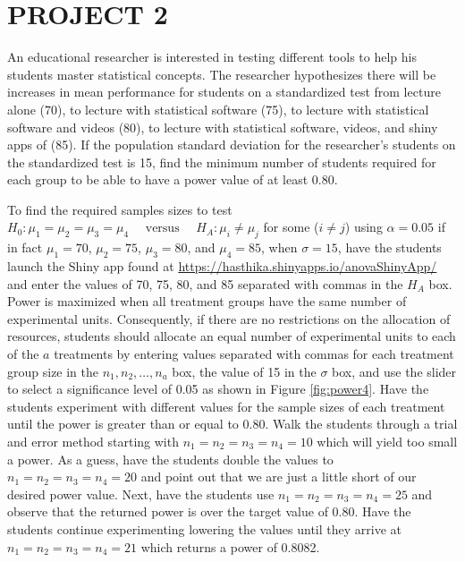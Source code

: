 \documentclass[
]{article}
\begin{document}
\hypertarget{project-2}{%
\section*{PROJECT 2}\label{project-2}}

An educational researcher is interested in testing different tools to help his students master statistical concepts. The researcher hypothesizes there will be increases in mean performance for students on a standardized test from lecture alone (70), to lecture with statistical software (75), to lecture with statistical software and videos (80), to lecture with statistical software, videos, and shiny apps of (85). If the population standard deviation for the researcher's students on the standardized test is 15, find the minimum number of students required for each group to be able to have a power value of at least 0.80.

To find the required samples sizes to test \(H_0: \mu_1 = \mu_2 = \mu_3 = \mu_4 \quad\text{ versus }\quad H_A: \mu_i \neq \mu_j\) for some (\(i \neq j\)) using \(\alpha = 0.05\) if in fact \(\mu_1 = 70\), \(\mu_2 = 75\), \(\mu_3 = 80\), and \(\mu_4 = 85\), when \(\sigma = 15\), have the students launch the Shiny app found at \url{https://hasthika.shinyapps.io/anovaShinyApp/} and enter the values of 70, 75, 80, and 85 separated with commas in the \(H_A\) box. Power is maximized when all treatment groups have the same number of experimental units. Consequently, if there are no restrictions on the allocation of resources, students should allocate an equal number of experimental units to each of the \(a\) treatments by entering values separated with commas for each treatment group size in the \(n_1, n_2,\ldots, n_a\) box, the value of 15 in the \(\sigma\) box, and use the slider to select a significance level of 0.05 as shown in Figure \ref{fig:power4}. Have the students experiment with different values for the sample sizes of each treatment until the power is greater than or equal to 0.80. Walk the students through a trial and error method starting with \(n_1 = n_2 = n_3 = n_4 = 10\) which will yield too small a power. As a guess, have the students double the values to \(n_1 = n_2 = n_3 = n_4 = 20\) and point out that we are just a little short of our desired power value. Next, have the students use \(n_1 = n_2 = n_3 = n_4 = 25\) and observe that the returned power is over the target value of 0.80. Have the students continue experimenting lowering the values until they arrive at \(n_1 = n_2 = n_3 = n_4 = 21\) which returns a power of 0.8082.
\end{document}
